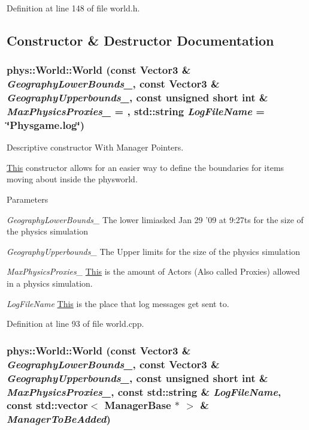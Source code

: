Definition at line 148 of file world.h.



\subsection{Constructor \& Destructor Documentation}
\hypertarget{classphys_1_1World_aadca3c8024bdc520d38cbbb80dccf884}{
\subsubsection[{World}]{\setlength{\rightskip}{0pt plus 5cm}phys::World::World (const {\bf Vector3} \& {\em GeographyLowerBounds\_\-}, \/  const {\bf Vector3} \& {\em GeographyUpperbounds\_\-}, \/  const unsigned short int \& {\em MaxPhysicsProxies\_\-} = {}, \/  std::string {\em LogFileName} = {\ttfamily \char`\"{}Physgame.log\char`\"{}})}}
\label{da/ddf/classphys_1_1World_aadca3c8024bdc520d38cbbb80dccf884}


Descriptive constructor With Manager Pointers. 

\hyperlink{structThis}{This} constructor allows for an easier way to define the boundaries for items moving about inside the physworld. 
\begin{DoxyParams}{Parameters}
\item[{\em GeographyLowerBounds\_\-}]The lower limiasked Jan 29 '09 at 9:27ts for the size of the physics simulation \item[{\em GeographyUpperbounds\_\-}]The Upper limits for the size of the physics simulation \item[{\em MaxPhysicsProxies\_\-}]\hyperlink{structThis}{This} is the amount of Actors (Also called Proxies) allowed in a physics simulation. \item[{\em LogFileName}]\hyperlink{structThis}{This} is the place that log messages get sent to. \end{DoxyParams}


Definition at line 93 of file world.cpp.

\hypertarget{classphys_1_1World_abc302f3cbf9fe54c8d0523508ce03377}{
\subsubsection[{World}]{\setlength{\rightskip}{0pt plus 5cm}phys::World::World (const {\bf Vector3} \& {\em GeographyLowerBounds\_\-}, \/  const {\bf Vector3} \& {\em GeographyUpperbounds\_\-}, \/  const unsigned short int \& {\em MaxPhysicsProxies\_\-}, \/  const std::string \& {\em LogFileName}, \/  const std::vector$<$ {\bf ManagerBase} $\ast$ $>$ \& {\em ManagerToBeAdded})}}
\label{da/ddf/classphys_1_1World_abc302f3cbf9fe54c8d0523508ce03377}


